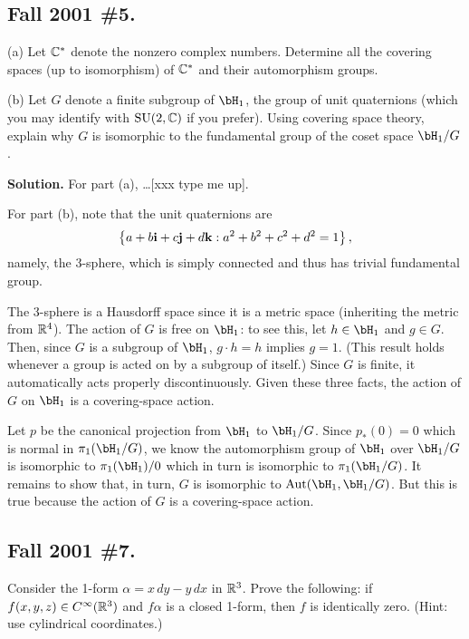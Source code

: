 \documentclass[10pt]{article}
\numberwithin{equation}{subsection}
\begin{document}
\subsection{Fall 2001 \#5.}
\label{sec:F01.5}

(a)  Let $\mathbb{C}^*$ denote the nonzero complex numbers.  Determine all the covering
spaces (up to isomorphism) of $\mathbb{C}^*$ and their automorphism groups.

(b) Let $G$ denote a finite subgroup of $\bH_1$, the group of unit quaternions
(which you may identify with $\mathrm{SU}(2,\mathbb{C})$ if you prefer).  Using
covering space theory, explain why $G$ is isomorphic to the fundamental group
of the coset space $\bH_1/G$.

\textbf{Solution.}  For part (a), \ldots [xxx type me up].

For part (b), note that the unit quaternions are
$$
	\left\{a + b\mathbf{i} + c\mathbf{j} + d\mathbf{k} : a^2+b^2+c^2+d^2=1\right\},
$$
namely, the 3-sphere, which is simply connected and thus has trivial
fundamental group.

The 3-sphere is a Hausdorff space since it is a metric space (inheriting the
metric from $\mathbb{R}^4$).  The action of $G$ is free on $\bH_1$: to see this, let $h
\in \bH_1$ and $g \in G$.  Then, since $G$ is a subgroup of $\bH_1$, $g \cdot h
= h$ implies $g=1$.  (This result holds whenever a group is acted on by a
subgroup of itself.)  Since $G$ is finite, it automatically acts properly
discontinuously.  Given these three facts, the action of $G$ on $\bH_1$ is a
covering-space action.

Let $p$ be the canonical projection from $\bH_1$ to $\bH_1/G$.  Since
$p_*(0)=0$ which is normal in $\pi_1(\bH_1/G)$, we know the automorphism group
of $\bH_1$ over $\bH_1/G$ is isomorphic to $\pi_1(\bH_1)/0$ which in turn is
isomorphic to $\pi_1(\bH_1/G)$.  It remains to show that, in turn, $G$ is
isomorphic to $\Aut(\bH_1, \bH_1/G)$.  But this is true because the action of
$G$ is a covering-space action.

\subsection{Fall 2001 \#7.}

Consider the 1-form $\alpha = x\,dy - y\,dx$ in $\mathbb{R}^3$.  Prove the following:
if $f(x,y,z)\in C^\infty(\mathbb{R}^3)$ and $f\alpha$ is a closed 1-form, then $f$ is
identically zero.  (Hint:  use cylindrical coordinates.)
\end{document}
